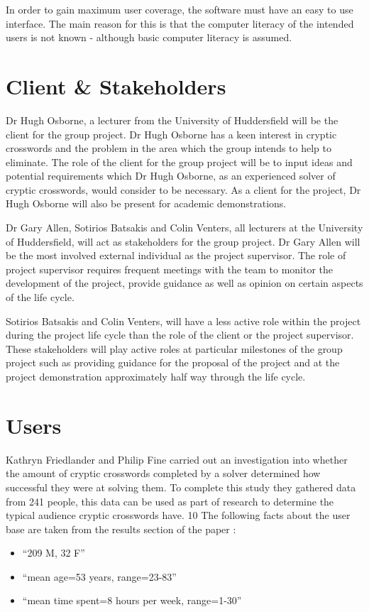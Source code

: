 In order to gain maximum user coverage, the software must have an easy to use interface.
 The main reason for this is that the computer literacy of the intended users is not
 known - although basic computer literacy is assumed.

\section{Client \& Stakeholders}
Dr Hugh Osborne, a lecturer from the University of Huddersfield will be 
the client for the group project. Dr Hugh Osborne has a keen interest in
 cryptic crosswords and the problem in the area which the group intends
 to help to eliminate. The role of the client for the group project will be to
 input ideas and potential requirements which Dr Hugh Osborne, as an
 experienced solver of cryptic crosswords, would consider to be necessary.
 As a client for the project, Dr Hugh Osborne will also be present for academic
 demonstrations.

Dr Gary Allen, Sotirios Batsakis and Colin Venters, all lecturers at the
 University of Huddersfield, will act as stakeholders for the group project.
 Dr Gary Allen will be the most involved external individual as the project 
supervisor. The role of project supervisor requires frequent meetings with the
 team to monitor the development of the project, provide guidance as well as 
opinion on certain aspects of the life cycle.  

Sotirios Batsakis and Colin Venters, will have a less active role within the project
 during the project life cycle than the role of the client or the project supervisor. 
These stakeholders will play active roles at particular milestones of the group 
project such as providing guidance for the proposal of the project and at the
 project demonstration approximately half way through the life cycle. 


\section{Users} 
Kathryn Friedlander and Philip Fine \citep{friedlander09} carried out an investigation into
whether the amount of cryptic crosswords completed by a solver determined how successful they
were at solving them.
To complete this study they gathered data from 241 people, this data can be used as part of
research to determine the typical audience cryptic crosswords have.
10
The following facts about the user base are taken from the results section of the paper \citep{friedlander09}:
\begin{itemize}
    \item ``209 M, 32 F''
    \item ``mean age=53 years, range=23-83''
    \item ``mean time spent=8 hours per week, range=1-30''
\end{itemize}

